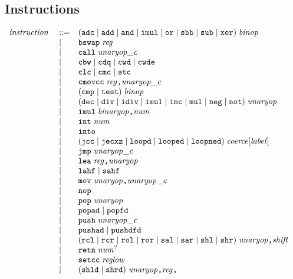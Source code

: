 \documentclass{article}
\newenvironment{gramrule}
  {\begin{flushleft}$\begin{array}{p{0.7in}ll}}
  {\end{array}$\end{flushleft}}
\newcommand{\nterm}[1]{{\it#1}}
\newcommand{\term}[1]{{\it#1}}
\newcommand{\ts}[1]{\hbox{\tt#1}}
\newcommand{\alt}{\mathrel{|}}
\begin{document}
\subsection{Instructions}
\begin{gramrule}
\nterm{instruction} &::=&
    (\ts{adc} \alt \ts{add} \alt \ts{and} \alt \ts{imul} \alt \ts{or} \alt
    \ts{sbb} \alt \ts{sub} \alt \ts{xor}) \; \nterm{binop} \\
&|& \ts{bswap} \; \nterm{reg} \\
&|& \ts{call} \; \nterm{unaryop\_c} \\
&|& \ts{cbw} \alt \ts{cdq} \alt \ts{cwd} \alt \ts{cwde} \\
&|& \ts{clc} \alt \ts{cmc} \alt \ts{stc} \\
&|& \ts{cmovcc} \; \nterm{reg} \ts{,} \nterm{unaryop\_c} \\
&|& (\ts{cmp} \alt \ts{test}) \; \nterm{binop} \\
&|& (\ts{dec} \alt \ts{div} \alt \ts{idiv} \alt \ts{imul} \alt \ts{inc} \alt
    \ts{mul} \alt \ts{neg} \alt \ts{not}) \; \nterm{unaryop} \\
&|& \ts{imul} \; \nterm{binaryop} \ts{,} \term{num} \\
&|& \ts{int} \; \term{num} \\
&|& \ts{into} \\
&|& (\ts{jcc} \alt \ts{jecxz} \alt \ts{loopd} \alt \ts{looped} \alt
    \ts{loopned}) \; \nterm{coerce}[\nterm{label}] \\
&|& \ts{jmp} \; \nterm{unaryop\_c} \\
&|& \ts{lea} \; \nterm{reg} \ts{,} \nterm{unaryop} \\
&|& \ts{lahf} \alt \ts{sahf} \\
&|& \ts{mov} \; \nterm{unaryop} \ts{,} \nterm{unaryop\_c} \\
&|& \ts{nop} \\
&|& \ts{pop} \; \nterm{unaryop} \\
&|& \ts{popad} \alt \ts{popfd} \\
&|& \ts{push} \; \nterm{unaryop\_c} \\
&|& \ts{pushad} \alt \ts{pushdfd} \\
&|& (\ts{rcl} \alt \ts{rcr} \alt \ts{rol} \alt \ts{ror} \alt \ts{sal} \alt
    \ts{sar} \alt \ts{shl} \alt \ts{shr}) \; \nterm{unaryop} \ts{,}
    \nterm{shift} \\
&|& \ts{retn} \; \term{num}^? \\
&|& \ts{setcc} \; \nterm{reglow} \\
&|& (\ts{shld} \alt \ts{shrd}) \; \nterm{unaryop} \ts{,} \nterm{reg} \ts{,}

\end{gramrule}
\end{document}
